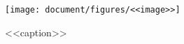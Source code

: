 \begin{wrapfigure}{<<pos>>}{<<width>>}
	\begin{center}
	\texttt{[image: document/figures/<<image>>]}
	\end{center}\vspace{-10pt}\caption{<<caption>>}
	\label{fig:<<id>>}
\end{wrapfigure}
\paragraph{}\vspace*{-\parskip}\vspace*{-\parsep}